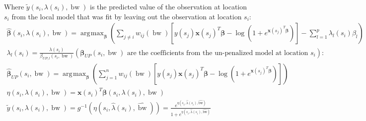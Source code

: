 \documentclass[authoryear ,review]{elsarticle}
\DeclareMathOperator*{\argmax}{\arg\!\max}
\DeclareMathOperator*{\bw}{\mbox{bw}}
\newcommand{\vect}[1]{\boldsymbol{#1}}
\begin{document}
		Where $\tilde{y} \left(s_i, \lambda(s_i), \bw \right)$ is the predicted value of the observation at location $s_i$ from the local model that was fit by leaving out the observation at location $s_i$:	
		\begin{gather*}
			\hat{\vect{\beta}} \left(s_i, \lambda(s_i), \bw \right) = \argmax_{\vect{\beta}} \left( \sum_{j \neq i} w_{ij}(\bw) \left[y(s_j) \vect{x}(s_j)^T \vect{\beta} - \log{(1+e^{\vect{x}(s_j)^T \vect{\beta}})} \right] -  \sum_{l=1}^p \lambda_l(s_i) \beta_l \right)\\	
			\lambda_l(s_i) = \frac{\lambda(s_i)}{\beta_{UP,l}(s_i, \bw)} \left( \vect{\beta}_{UP}(s_i, \bw) \text{ are the coefficients from the un-penalized model at location } s_i \right) \text{:}\\
			\hat{\vect{\beta}}_{UP}(s_i, \bw) = \argmax_{\vect{\beta}} \left( \sum_{j=1}^n w_{ij}(\bw) \left[ y(s_j) \vect{x}(s_j)^T \vect{\beta} - \log{(1+e^{\vect{x}(s_j)^T \vect{\beta}})} \right] \right)\\	
			\eta \left(s_i, \lambda(s_i), \bw \right) = \vect{x}(s_i)^T \vect{\beta} \left(s_i, \lambda(s_i), \bw \right)\\
			\tilde{y} \left(s_i, \lambda(s_i), \bw \right) = g^{-1} \left(\eta \left(s_i, \hat{\lambda}(s_i), \hat{\bw} \right) \right) = \frac{e^{\eta \left(s_i, \hat{\lambda}(s_i), \hat{\text{bw}} \right)}}{1+e^{\eta \left(s_i, \hat{\lambda}(s_i), \hat{\text{bw}} \right)}}			
		\end{gather*}
		
\end{document}
